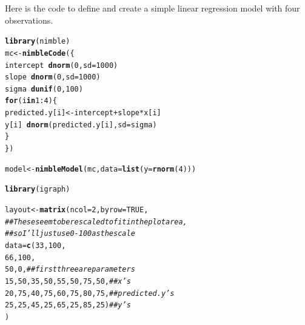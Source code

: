 \documentclass[12pt,oneside]{book}\usepackage[]{graphicx}\usepackage[]{color}
\makeatletter
\newcommand{\hlnum}[1]{\textcolor[rgb]{0.686,0.059,0.569}{#1}}%
\newcommand{\hlcom}[1]{\textcolor[rgb]{0.678,0.584,0.686}{\textit{#1}}}%
\newcommand{\hlopt}[1]{\textcolor[rgb]{0,0,0}{#1}}%
\newcommand{\hlstd}[1]{\textcolor[rgb]{0.345,0.345,0.345}{#1}}%
\newcommand{\hlkwa}[1]{\textcolor[rgb]{0.161,0.373,0.58}{\textbf{#1}}}%
\newcommand{\hlkwb}[1]{\textcolor[rgb]{0.69,0.353,0.396}{#1}}%
\newcommand{\hlkwc}[1]{\textcolor[rgb]{0.333,0.667,0.333}{#1}}%
\newcommand{\hlkwd}[1]{\textcolor[rgb]{0.737,0.353,0.396}{\textbf{#1}}}%
\newenvironment{kframe}{%
 \def\at@end@of@kframe{}%
 \ifinner\ifhmode%
  \def\at@end@of@kframe{\end{minipage}}%
  \begin{minipage}{\columnwidth}%
 \fi\fi%
 \def\FrameCommand##1{\hskip\@totalleftmargin \hskip-\fboxsep
 \colorbox{shadecolor}{##1}\hskip-\fboxsep
     \hskip-\linewidth \hskip-\@totalleftmargin \hskip\columnwidth}%
 \MakeFramed {\advance\hsize-\width
   \@totalleftmargin\z@ \linewidth\hsize
   \@setminipage}}%
 {\par\unskip\endMakeFramed%
 \at@end@of@kframe}
\newenvironment{knitrout}{}{} %
\makeatother
\begin{document}
Here is the code to define and create a simple linear regression model with four observations. 



\begin{knitrout}
\color{fgcolor}\begin{kframe}
\begin{alltt}
\hlkwd{library}\hlstd{(nimble)}
\hlstd{mc} \hlkwb{<-} \hlkwd{nimbleCode}\hlstd{(\{}
    \hlstd{intercept} \hlopt{~} \hlkwd{dnorm}\hlstd{(}\hlnum{0}\hlstd{,} \hlkwc{sd} \hlstd{=} \hlnum{1000}\hlstd{)}
    \hlstd{slope} \hlopt{~} \hlkwd{dnorm}\hlstd{(}\hlnum{0}\hlstd{,} \hlkwc{sd} \hlstd{=} \hlnum{1000}\hlstd{)}
    \hlstd{sigma} \hlopt{~} \hlkwd{dunif}\hlstd{(}\hlnum{0}\hlstd{,} \hlnum{100}\hlstd{)}
    \hlkwa{for}\hlstd{(i} \hlkwa{in} \hlnum{1}\hlopt{:}\hlnum{4}\hlstd{) \{}
        \hlstd{predicted.y[i]} \hlkwb{<-} \hlstd{intercept} \hlopt{+} \hlstd{slope} \hlopt{*} \hlstd{x[i]}
        \hlstd{y[i]} \hlopt{~} \hlkwd{dnorm}\hlstd{(predicted.y[i],} \hlkwc{sd} \hlstd{= sigma)}
    \hlstd{\}}
\hlstd{\})}

\hlstd{model} \hlkwb{<-} \hlkwd{nimbleModel}\hlstd{(mc,} \hlkwc{data} \hlstd{=} \hlkwd{list}\hlstd{(}\hlkwc{y} \hlstd{=} \hlkwd{rnorm}\hlstd{(}\hlnum{4}\hlstd{)))}

\hlkwd{library}\hlstd{(igraph)}

\hlstd{layout} \hlkwb{<-} \hlkwd{matrix}\hlstd{(}\hlkwc{ncol} \hlstd{=} \hlnum{2}\hlstd{,} \hlkwc{byrow} \hlstd{=} \hlnum{TRUE}\hlstd{,}
   \hlcom{## These seem to be rescaled to fit in the plot area,}
   \hlcom{## so I'll just use 0-100 as the scale}
                 \hlkwc{data} \hlstd{=} \hlkwd{c}\hlstd{(}\hlnum{33}\hlstd{,} \hlnum{100}\hlstd{,}
                          \hlnum{66}\hlstd{,} \hlnum{100}\hlstd{,}
                          \hlnum{50}\hlstd{,} \hlnum{0}\hlstd{,} \hlcom{## first three are parameters}
                          \hlnum{15}\hlstd{,} \hlnum{50}\hlstd{,} \hlnum{35}\hlstd{,} \hlnum{50}\hlstd{,} \hlnum{55}\hlstd{,} \hlnum{50}\hlstd{,} \hlnum{75}\hlstd{,} \hlnum{50}\hlstd{,} \hlcom{## x's}
                          \hlnum{20}\hlstd{,} \hlnum{75}\hlstd{,} \hlnum{40}\hlstd{,} \hlnum{75}\hlstd{,} \hlnum{60}\hlstd{,} \hlnum{75}\hlstd{,} \hlnum{80}\hlstd{,} \hlnum{75}\hlstd{,} \hlcom{## predicted.y's}
                          \hlnum{25}\hlstd{,} \hlnum{25}\hlstd{,} \hlnum{45}\hlstd{,} \hlnum{25}\hlstd{,} \hlnum{65}\hlstd{,} \hlnum{25}\hlstd{,} \hlnum{85}\hlstd{,} \hlnum{25}\hlstd{)} \hlcom{## y's}
                 \hlstd{)}


\end{alltt}
\end{kframe}
\end{knitrout}
\end{document}

